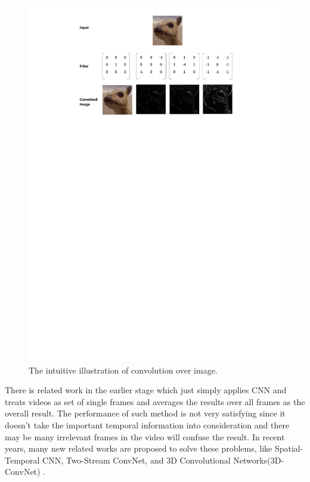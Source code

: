 \begin{figure}
	\includegraphics[trim=2cm 20cm 0cm 1cm]{figs/conv.pdf}
	\caption{The intuitive illustration of convolution over image.}
	\label{fig:conv}
\end{figure}
 
\par
There is related work \cite{ning2005} in the earlier stage which just simply applies CNN and treats videos as set of single frames and averages the results over all frames as the overall result. The performance of such method is not very satisfying since it doesn't take the important temporal information into consideration and there may be many irrelevant frames in the video will confuse the result. In recent years, many new related works are proposed to solve these problems, like Spatial-Temporal CNN\cite{karpathy2014}, Two-Stream ConvNet\cite{simonyan2014}, and 3D Convolutional Networks(3D-ConvNet) \cite{3dcnn_1} \cite{Ji2013} \cite{Tran2015}.  

